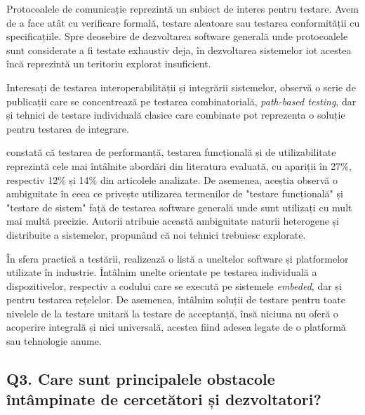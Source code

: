 Protocoalele de comunicație reprezintă un subiect de interes pentru testare. Avem de a face atât cu verificare formală, testare aleatoare sau testarea conformității cu specificațiile. Spre deosebire de dezvoltarea software generală unde protocoalele sunt considerate a fi testate exhaustiv deja, în dezvoltarea sistemelor \acrshort{iot} acestea încă reprezintă un teritoriu explorat insuficient. 

Interesați de testarea interoperabilității și integrării sistemelor, \cite{Bures2020} observă o serie de publicații care se concentrează pe testarea combinatorială, \textit{path-based testing}, dar și tehnici de testare individuală clasice care combinate pot reprezenta o soluție pentru testarea de integrare. 

\cite{Corts2019} constată că testarea de performanță, testarea funcțională și de utilizabilitate reprezintă cele mai întâlnite abordări din literatura evaluată, cu apariții în 27\%, respectiv 12\% și 14\% din articolele analizate. De asemenea, aceștia observă o ambiguitate în ceea ce privește utilizarea termenilor de "testare funcțională" și "testare de sistem" față de testarea software generală unde sunt utilizați cu mult mai multă precizie. Autorii atribuie această ambiguitate naturii heterogene și distribuite a sistemelor, propunând că noi tehnici trebuiesc explorate. 

În sfera practică a testării, \cite{Dias2018} realizează o listă a uneltelor software și platformelor utilizate în industrie. Întâlnim unelte orientate pe testarea individuală a dispozitivelor, respectiv a codului care se execută pe sistemele \textit{embeded}, dar și pentru testarea rețelelor. De asemenea, întâlnim soluții de testare pentru toate nivelele de la testare unitară la testare de acceptanță, însă niciuna nu oferă o acoperire integrală și nici universală, acestea fiind adesea legate de o platformă sau tehnologie anume. %

\subsection*{Q3. Care sunt principalele obstacole întâmpinate de cercetători și dezvoltatori?}

